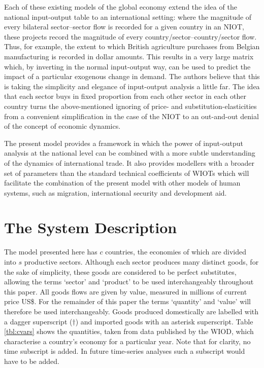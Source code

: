 \documentclass[a4paper]{article}
\begin{document}
Each of these existing models of the global economy extend the idea of the national input-output table to an international setting: where the magnitude of every bilateral sector--sector flow is recorded for a given country in an NIOT, these projects record the magnitude of every country/sector--country/sector flow.
Thus, for example, the extent to which British agriculture purchases from Belgian manufacturing is recorded in dollar amounts.
This results in a very large matrix which, by inverting in the normal input-output way, can be used to predict the impact of a particular exogenous change in demand.
The authors believe that this is taking the simplicity and elegance of input-output analysis a little far. The idea that each sector buys in fixed proportion from each other sector in each other country turns the above-mentioned ignoring of price- and substitution-elasticities from a convenient simplification in the case of the NIOT to an out-and-out denial of the concept of economic dynamics.

The present model provides a framework in which the power of input-output analysis at the national level can be combined with a more subtle understanding of the dynamics of international trade.
It also provides modellers with a broader set of parameters than the standard technical coefficients of WIOTs which will facilitate the combination of the present model with other models of human systems, such as migration, international security and development aid.

\section{The System Description} \label{sec:system}
The model presented here has $c$ countries, the economies of which are divided into $s$ productive sectors.
Although each sector produces many distinct goods, for the sake of simplicity, these goods are considered to be perfect substitutes, allowing the terms `sector' and `product' to be used interchangeably throughout this paper.
All goods flows are given by value, measured in millions of current price US\$.
For the remainder of this paper the terms `quantity' and `value' will therefore be used interchangeably.
Goods produced domestically are labelled with a dagger superscript ($\dagger$) and imported goods with an asterisk superscript.
Table \ref{tbl:cvars} shows the quantities, taken from data published by the WIOD, which characterise a country's economy for a particular year.
Note that for clarity, no time subscript is added. In future time-series analyses such a subscript would have to be added.
\end{document}
